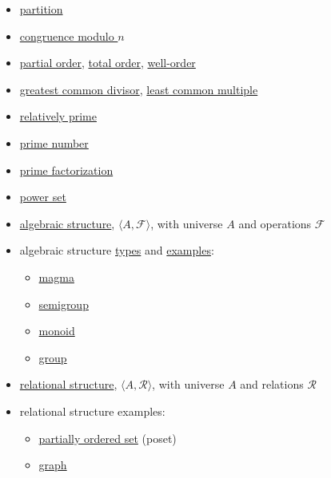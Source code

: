 \documentclass[12pt]{article}
\newcommand\<{\ensuremath{\langle}}
\renewcommand\>{\ensuremath{\rangle}}
\begin{document}
\begin{itemize}
\item \href{http://en.wikipedia.org/wiki/Partition_of_a_set}{partition}
\item \href{http://en.wikipedia.org/wiki/Congruence_relation}{congruence modulo $n$}
\item \href{http://en.wikipedia.org/wiki/Partially_ordered_set#Formal_definition}{partial order}, 
\href{http://en.wikipedia.org/wiki/Total_order}{total order},
\href{http://en.wikipedia.org/wiki/Well-order}{well-order}
\item \href{http://en.wikipedia.org/wiki/Greatest_common_divisor}{greatest common divisor}, 
\href{http://en.wikipedia.org/wiki/Least_common_multiple}{least common multiple}
\item \href{http://en.wikipedia.org/wiki/Coprime_integers}{relatively prime}
\item \href{http://en.wikipedia.org/wiki/Prime_number}{prime number}
\item \href{http://en.wikipedia.org/wiki/Fundamental_theorem_of_arithmetic}{prime factorization}
\item \href{http://en.wikipedia.org/wiki/Power_set}{power set}
\item \href{http://en.wikipedia.org/wiki/Algebraic_structure}{algebraic structure}, 
  $\<A, \mathcal{F}\>$, with universe $A$ and operations $\mathcal{F}$ 
\item algebraic structure \href{http://en.wikipedia.org/wiki/Outline_of_algebraic_structures#Types_of_algebraic_structures}{types} and 
\href{http://en.wikipedia.org/wiki/Outline_of_algebraic_structures}{examples}:
  \begin{itemize}
  \item \href{http://en.wikipedia.org/wiki/Magma_(algebra)}{magma}
  \item \href{http://en.wikipedia.org/wiki/Semigroup}{semigroup}
  \item \href{http://en.wikipedia.org/wiki/Monoid}{monoid}
  \item \href{http://en.wikipedia.org/wiki/Group_(mathematics)}{group} %
  \end{itemize}


\item \href{http://en.wikipedia.org/wiki/Structure_(mathematical_logic)}{relational structure}, 
  $\<A, \mathcal{R}\>$, with universe $A$ and relations $\mathcal{R}$ 
\item relational structure examples: 
  \begin{itemize}
  \item \href{http://en.wikipedia.org/wiki/Partially_ordered_set}{partially ordered set} (poset) 
    \item \href{http://en.wikipedia.org/wiki/Graph_(mathematics)}{graph}
  \end{itemize}


\end{itemize}
\end{document}
